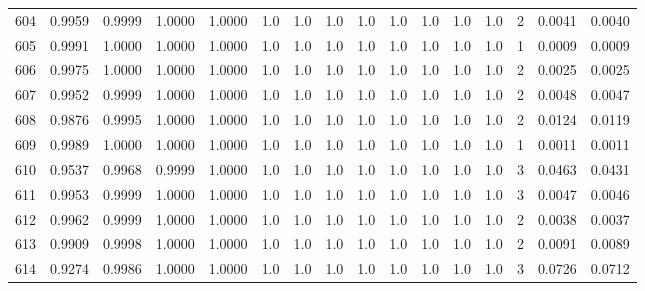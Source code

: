 \begin{tabular}{lrrrrrrrrrrrrrrr}
604 &      0.9959 &  0.9999 &  1.0000 &  1.0000 &     1.0 &     1.0 &     1.0 &     1.0 &     1.0 &     1.0 &      1.0 &        1.0 &      2 &                    0.0041 &                     0.0040 \\
605 &      0.9991 &  1.0000 &  1.0000 &  1.0000 &     1.0 &     1.0 &     1.0 &     1.0 &     1.0 &     1.0 &      1.0 &        1.0 &      1 &                    0.0009 &                     0.0009 \\
606 &      0.9975 &  1.0000 &  1.0000 &  1.0000 &     1.0 &     1.0 &     1.0 &     1.0 &     1.0 &     1.0 &      1.0 &        1.0 &      2 &                    0.0025 &                     0.0025 \\
607 &      0.9952 &  0.9999 &  1.0000 &  1.0000 &     1.0 &     1.0 &     1.0 &     1.0 &     1.0 &     1.0 &      1.0 &        1.0 &      2 &                    0.0048 &                     0.0047 \\
608 &      0.9876 &  0.9995 &  1.0000 &  1.0000 &     1.0 &     1.0 &     1.0 &     1.0 &     1.0 &     1.0 &      1.0 &        1.0 &      2 &                    0.0124 &                     0.0119 \\
609 &      0.9989 &  1.0000 &  1.0000 &  1.0000 &     1.0 &     1.0 &     1.0 &     1.0 &     1.0 &     1.0 &      1.0 &        1.0 &      1 &                    0.0011 &                     0.0011 \\
610 &      0.9537 &  0.9968 &  0.9999 &  1.0000 &     1.0 &     1.0 &     1.0 &     1.0 &     1.0 &     1.0 &      1.0 &        1.0 &      3 &                    0.0463 &                     0.0431 \\
611 &      0.9953 &  0.9999 &  1.0000 &  1.0000 &     1.0 &     1.0 &     1.0 &     1.0 &     1.0 &     1.0 &      1.0 &        1.0 &      3 &                    0.0047 &                     0.0046 \\
612 &      0.9962 &  0.9999 &  1.0000 &  1.0000 &     1.0 &     1.0 &     1.0 &     1.0 &     1.0 &     1.0 &      1.0 &        1.0 &      2 &                    0.0038 &                     0.0037 \\
613 &      0.9909 &  0.9998 &  1.0000 &  1.0000 &     1.0 &     1.0 &     1.0 &     1.0 &     1.0 &     1.0 &      1.0 &        1.0 &      2 &                    0.0091 &                     0.0089 \\
614 &      0.9274 &  0.9986 &  1.0000 &  1.0000 &     1.0 &     1.0 &     1.0 &     1.0 &     1.0 &     1.0 &      1.0 &        1.0 &      3 &                    0.0726 &                     0.0712 \\

\end{tabular}
